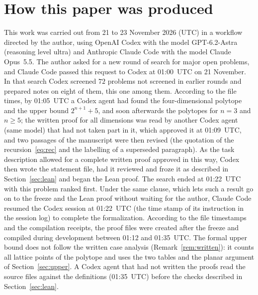 \documentclass[11pt]{article}
\theoremstyle{definition}
\theoremstyle{remark}
\begin{document}
\section*{How this paper was produced}
This work was carried out from 21 to 23 November 2026 (UTC) in a workflow
directed by the author, using OpenAI Codex with the model GPT-6.2-Astra
(reasoning level ultra) and Anthropic Claude Code with the model Claude
Opus~5.5. The author asked for a new round of search for major open problems, and
Claude Code passed this request to Codex at 01:00~UTC on 21 November. In that
search Codex screened $72$ problems not screened in earlier rounds and prepared
notes on eight of them, this one among them. According to the file times, by
01:05~UTC a Codex agent had found the four-dimensional polytope and the upper
bound $2^{n+1}+5$, and soon afterwards the polytopes for $n=3$ and $n\ge5$; the
written proof for all dimensions was read by another Codex agent (same model)
that had not taken part in it, which approved it at 01:09~UTC, and two
passages of the manuscript were then revised (the quotation of the
recursion~\eqref{eq:rec} and the labelling of a superseded paragraph). As the task description
allowed for a complete written proof approved in this way, Codex then wrote
the statement file, had it reviewed and froze it as described in Section~\ref{sec:lean}
and began the Lean proof. The search ended at 01:22~UTC with this problem
ranked first. Under the same clause, which lets such a result go on to the
freeze and the Lean proof without waiting for the author, Claude Code resumed
the Codex session at 01:22~UTC (the time stamp of its instruction in the
session log) to complete the formalization. According to the file timestamps and the compilation receipts, the
proof files were created after the freeze and compiled during development
between 01:12 and 01:35~UTC. The formal upper bound does not follow the written
case analysis (Remark~\ref{rem:written}): it counts all lattice points of the
polytope and uses the two tables and the planar argument of
Section~\ref{sec:upper}. A Codex agent that had not written the proofs read
the source files against the definitions (01:35~UTC) before the checks
described in Section~\ref{sec:lean}.
\end{document}
